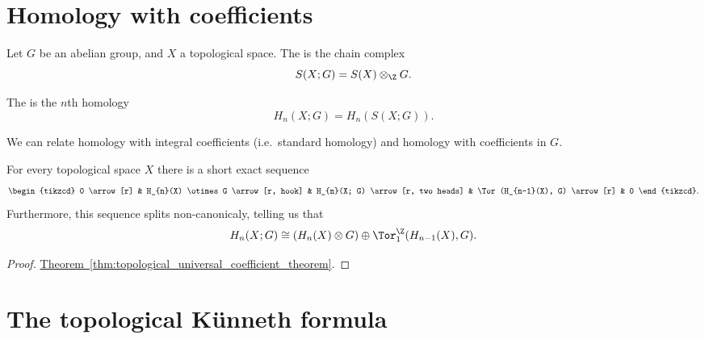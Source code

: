 \documentclass[main.tex]{subfiles}
\begin{document}
\section{Homology with coefficients}
\label{sec:homology_with_coefficients}

\begin{definition}
  \label{def:homology_with_coefficients}
  Let $G$ be an abelian group, and $X$ a topological space. The  is the chain complex
  \begin{equation*}
    S(X; G) = S(X) \otimes_{\Z} G.
  \end{equation*}

  The  is the $n$th homology
  \begin{equation*}
    H_{n}(X; G) = H_{n}(S(X; G)).
  \end{equation*}
\end{definition}

We can relate homology with integral coefficients (i.e.\ standard homology) and homology with coefficients in $G$.

\begin{theorem}
  \label{thm:topological_universal_coefficient_theorem}
  For every topological space $X$ there is a short exact sequence
  \begin{equation*}
    \begin{tikzcd}
      0
      \arrow[r]
      & H_{n}(X) \otimes G
      \arrow[r, hook]
      & H_{n}(X; G)
      \arrow[r, two heads]
      & \Tor(H_{n-1}(X), G)
      \arrow[r]
      & 0
    \end{tikzcd}.
  \end{equation*}
  Furthermore, this sequence splits non-canonicaly, telling us that
  \begin{equation*}
    H_{n}(X; G) \cong (H_{n}(X) \otimes G) \oplus \Tor^{\Z}_{1}(H_{n-1}(X), G).
  \end{equation*}
\end{theorem}
\begin{proof}
  \hyperref[thm:topological_universal_coefficient_theorem]{Theorem~\ref*{thm:topological_universal_coefficient_theorem}}.
\end{proof}

\section{The topological Künneth formula}
\label{sec:the_topological_kunneth_formula}
\end{document}
